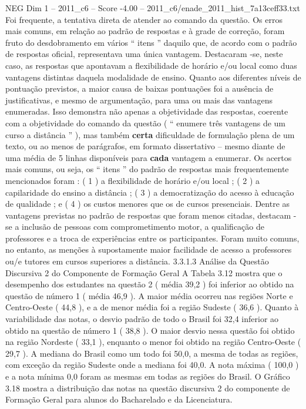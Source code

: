 \begin{textsample}{NEG Dim 1 – 2011\_c6 – Score -4.00 – 2011\_c6/enade\_2011\_hist\_7a13ceff33.txt}
Foi frequente, a tentativa direta de atender ao comando da questão.
Os erros mais comuns, em relação ao padrão de respostas e à grade de correção, foram fruto do desdobramento em vários “ itens ” daquilo que, de acordo com o padrão de respostas oficial, representava uma única vantagem.
Destacaram -se, neste caso, as respostas que apontavam a flexibilidade de horário e/ou local como duas vantagens distintas daquela modalidade de ensino.
Quanto aos diferentes níveis de pontuação previstos, a maior causa de baixas pontuações foi a ausência de justificativas, e mesmo de argumentação, para uma ou mais das vantagens enumeradas.
Isso demonstra não apenas a objetividade das respostas, coerente com a objetividade do comando da questão ( “ enumere três vantagens de um curso a distância ” ), mas também \textbf{certa} dificuldade de formulação plena de um texto, ou ao menos de parágrafos, em formato dissertativo – mesmo diante de uma média de 5 linhas disponíveis para \textbf{cada} vantagem a enumerar.
Os acertos mais comuns, ou seja, os “ itens ” do padrão de respostas mais frequentemente mencionados foram : ( 1 ) a flexibilidade de horário e/ou local ; ( 2 ) a capilaridade do ensino a distância ; ( 3 ) a democratização do acesso à educação de qualidade ; e ( 4 ) os custos menores que os de cursos presenciais.
Dentre as vantagens previstas no padrão de respostas que foram menos citadas, destacam -se a inclusão de pessoas com comprometimento motor, a qualificação de professores e a troca de experiências entre os participantes.
Foram muito comuns, no entanto, as menções à supostamente maior facilidade de acesso a professores ou/e tutores em cursos superiores a distância. 3.3.1.3 Análise da Questão Discursiva 2 do Componente de Formação Geral A Tabela 3.12 mostra que o desempenho dos estudantes na questão 2 ( média 39,2 ) foi inferior ao obtido na questão de número 1 ( média 46,9 ).
A maior média ocorreu nas regiões Norte e Centro-Oeste ( 44,8 ), e a de menor média foi a região Sudeste ( 36,6 ).
Quanto à variabilidade das notas, o desvio padrão de todo o Brasil foi 32,4 inferior ao obtido na questão de número 1 ( 38,8 ).
O maior desvio nessa questão foi obtido na região Nordeste ( 33,1 ), enquanto o menor foi obtido na região Centro-Oeste ( 29,7 ).
A mediana do Brasil como um todo foi 50,0, a mesma de todas as regiões, com exceção da região Sudeste onde a mediana foi 40,0.
A nota máxima ( 100,0 ) e a nota mínima 0,0 foram as mesmas em todas as regiões do Brasil.
O Gráfico 3.18 mostra a distribuição das notas na questão discursiva 2 do componente de Formação Geral para alunos do Bacharelado e da Licenciatura.

\end{textsample}
